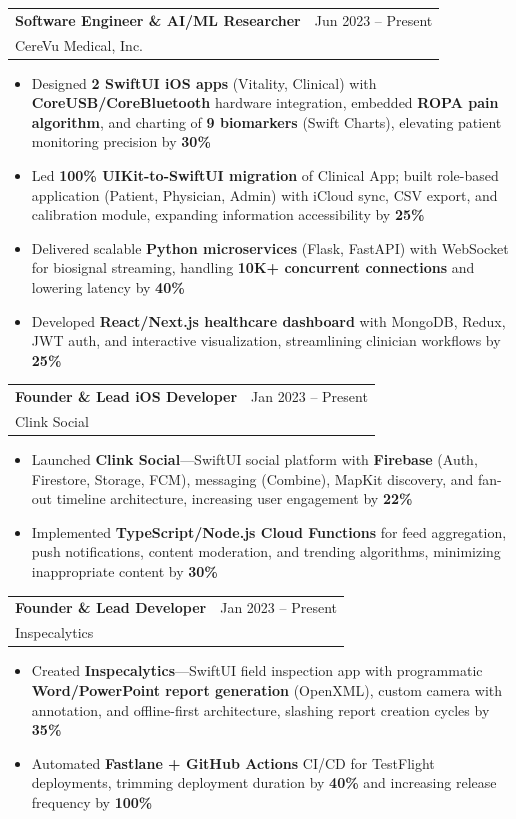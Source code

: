 \documentclass[11pt,letterpaper]{article}
\makeatletter
\newcommand{\cventry}[5]{%
  \noindent\begin{tabularx}{\textwidth}{@{}X r@{}}
    {\bfseries\color{headerblue}#2} & {\color{graytext}#1} \\
    {\color{accentcolor}#3}\enskip{\color{lightgray}#4} & \\
  \end{tabularx}%
  \vspace{0.02em}%
  #5%
  \vspace{0.15em}%
}
\makeatother
\begin{document}
\cventry{Jun 2023 -- Present}{Software Engineer \& AI/ML Researcher}{CereVu Medical, Inc.}{San Francisco Bay Area, CA}{
\begin{itemize}[leftmargin=0.4cm, itemsep=0.02cm, topsep=0.05cm, label={\color{goldaccent}\textbullet}]
  \item Designed \textbf{2 SwiftUI iOS apps} (Vitality, Clinical) with \textbf{CoreUSB/CoreBluetooth} hardware integration, embedded \textbf{ROPA pain algorithm}, and charting of \textbf{9 biomarkers} (Swift Charts), elevating patient monitoring precision by \textbf{30\%}
  \item Led \textbf{100\% UIKit-to-SwiftUI migration} of Clinical App; built role-based application (Patient, Physician, Admin) with iCloud sync, CSV export, and calibration module, expanding information accessibility by \textbf{25\%}
  \item Delivered scalable \textbf{Python microservices} (Flask, FastAPI) with WebSocket for biosignal streaming, handling \textbf{10K+ concurrent connections} and lowering latency by \textbf{40\%}
  \item Developed \textbf{React/Next.js healthcare dashboard} with MongoDB, Redux, JWT auth, and interactive visualization, streamlining clinician workflows by \textbf{25\%}
\end{itemize}
}

\cventry{Jan 2023 -- Present}{Founder \& Lead iOS Developer}{Clink Social}{McKinney, TX}{
\begin{itemize}[leftmargin=0.4cm, itemsep=0.02cm, topsep=0.05cm, label={\color{goldaccent}\textbullet}]
  \item Launched \textbf{Clink Social}---SwiftUI social platform with \textbf{Firebase} (Auth, Firestore, Storage, FCM), messaging (Combine), MapKit discovery, and fan-out timeline architecture, increasing user engagement by \textbf{22\%}
  \item Implemented \textbf{TypeScript/Node.js Cloud Functions} for feed aggregation, push notifications, content moderation, and trending algorithms, minimizing inappropriate content by \textbf{30\%}
\end{itemize}
}

\cventry{Jan 2023 -- Present}{Founder \& Lead Developer}{Inspecalytics}{McKinney, TX}{
\begin{itemize}[leftmargin=0.4cm, itemsep=0.02cm, topsep=0.05cm, label={\color{goldaccent}\textbullet}]
  \item Created \textbf{Inspecalytics}---SwiftUI field inspection app with programmatic \textbf{Word/PowerPoint report generation} (OpenXML), custom camera with annotation, and offline-first architecture, slashing report creation cycles by \textbf{35\%}
  \item Automated \textbf{Fastlane + GitHub Actions} CI/CD for TestFlight deployments, trimming deployment duration by \textbf{40\%} and increasing release frequency by \textbf{100\%}
\end{itemize}
}
\end{document}
